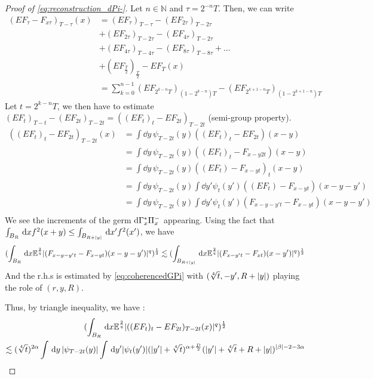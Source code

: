 \begin{proof}[Proof of \eqref{eq:reconstruction_dPi-}]
    Let $n\in \mathbb{N}$ and $\tau = 2^{-n}T.$
    Then, we can write
    \begin{align*}
        (EF_\tau - F_{x\tau})_{T-\tau}(x) &= (EF_\tau)_{T-\tau} - (EF_{2\tau})_{T - 2\tau} \\
        & +(EF_{2\tau})_{T-2\tau} - (EF_{4\tau})_{T - 2\tau}\\
        & +(EF_{4\tau})_{T-4\tau} - (EF_{8\tau})_{T - 8\tau} + \dots \\
        & +(EF_{\frac{T}{2}})_{\frac{T}{2}} -EF_T (x)\\
        & = \sum_{k=0}^{n-1} (EF_{2^{k-n}T})_{(1-2^{k-n})T} - (EF_{2^{k+1-n}T})_{(1-2^{k+1-n})T}
    \end{align*}
    Let $t= 2^{k-n}T$, we then have to estimate $(EF_t)_{T-t} - (EF_{2t})_{T-2t} = ((EF_t)_t - EF_{2t})_{T-2t}$ (semi-group property).
    \begin{align*}
        ((EF_t)_t - EF_{2t})_{T-2t}(x) &= \int \dd y \, \psi_{T-2t}(y) ((EF_t)_t - EF_{2t})(x-y)\\
        &= \int \dd y \, \psi_{T-2t}(y) ((EF_t)_t - F_{x-y 2t})(x-y)\\
        &= \int \dd y \, \psi_{T-2t}(y) ((EF_t) - F_{x-yt})_t(x-y) \\
        &= \int \dd y \, \psi_{T-2t}(y) \int \dd y' \psi_t(y') ((EF_t) - F_{x-y t})(x-y-y')\\
        &= \int \dd y \, \psi_{T-2t}(y) \int \dd y' \psi_t(y') (F_{x-y-y' t} - F_{x-y t})(x-y-y')\\
    \end{align*}
    We see the increments of the germ $\mathrm{d}\Gamma^*_x \Pi^-_x$ appearing.
    Using the fact that $\int_{B_R} \,\mathrm{d} x f^2(x+y) \leq \int_{B_{R+\lvert y\rvert}} \,\mathrm{d} x' f^2(x')$, we have 
    \begin{equation}
        (\int_{B_R} \,\mathrm{d} x \mathbb{E}^\frac{2}{q} \lvert(F_{x-y-y' t} - F_{x-y t})(x-y-y')\rvert^q)^\frac{1}{2} \lesssim (\int_{B_{R+\lvert y\rvert}} \,\mathrm{d} x \mathbb{E}^\frac{2}{q} \lvert(F_{x-y' t} - F_{x t})(x-y')\rvert^q)^\frac{1}{2}
    \end{equation}
    And the r.h.s is estimated by \eqref{eq:coherencedGPi} with $(\sqrt[4]{t},-y', R+\lvert y\rvert)$ playing the role of $(r,y,R)$.
    
    Thus, by triangle inequality, we have :
    \begin{multline}
        (\int_{B_R} \,\mathrm{d} x \mathbb{E}^\frac{2}{q} \lvert((EF_t)_t - EF_{2t})_{T-2t}(x)\rvert^q)^\frac{1}{2} \\
         \lesssim (\sqrt[4]{t})^{2\alpha} \int \,\mathrm{d} y \, \lvert\psi_{T-2t}(y)\rvert \int \,\mathrm{d} y' \lvert\psi_t(y')\rvert (\lvert y'\rvert+ \sqrt[4]{t})^{\alpha+\frac{D}{2}}(\lvert y'\rvert+\sqrt[4]{t}+R+\lvert y\rvert)^{\lvert\beta\rvert-2-3\alpha}
    \end{multline}


\end{proof}
